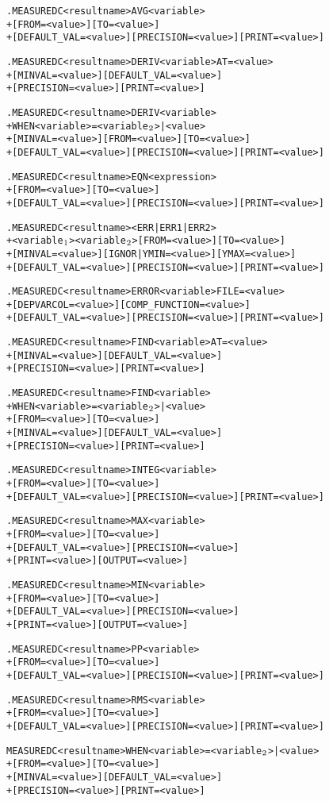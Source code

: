 \begin{Command}
\begin{alltt}
.MEASURE DC <result name> AVG <variable>
+ [FROM=<value>] [TO=<value>]
+ [DEFAULT_VAL=<value>] [PRECISION=<value>] [PRINT=<value>]

.MEASURE DC <result name> DERIV <variable> AT=<value>
+ [MINVAL=<value>] [DEFAULT_VAL=<value>]
+ [PRECISION=<value>] [PRINT=<value>]

.MEASURE DC <result name> DERIV <variable>
+ WHEN <variable>=<variable\(\sb{2}\)>|<value>
+ [MINVAL=<value>] [FROM=<value>] [TO=<value>]
+ [DEFAULT_VAL=<value>] [PRECISION=<value>] [PRINT=<value>]

.MEASURE DC <result name> EQN <expression> 
+ [FROM=<value>] [TO=<value>] 
+ [DEFAULT_VAL=<value>] [PRECISION=<value>] [PRINT=<value>]

.MEASURE DC <result name> <ERR|ERR1|ERR2>
+ <variable\(\sb{1}\)> <variable\(\sb{2}\)> [FROM=<value>] [TO=<value>]
+ [MINVAL=<value>] [IGNOR|YMIN=<value>] [YMAX=<value>]
+ [DEFAULT_VAL=<value>] [PRECISION=<value>] [PRINT=<value>]

.MEASURE DC <result name> ERROR <variable> FILE=<value>
+ [DEPVARCOL=<value>] [COMP_FUNCTION=<value>]
+ [DEFAULT_VAL=<value>] [PRECISION=<value>] [PRINT=<value>]

.MEASURE DC <result name> FIND <variable> AT=<value>
+ [MINVAL=<value>] [DEFAULT_VAL=<value>]
+ [PRECISION=<value>] [PRINT=<value>]

.MEASURE DC <result name> FIND <variable>
+ WHEN <variable>=<variable\(\sb{2}\)>|<value>
+ [FROM=<value>] [TO=<value>]
+ [MINVAL=<value>] [DEFAULT_VAL=<value>]
+ [PRECISION=<value>] [PRINT=<value>]

.MEASURE DC <result name> INTEG <variable>
+ [FROM=<value>] [TO=<value>]
+ [DEFAULT_VAL=<value>] [PRECISION=<value>] [PRINT=<value>]

.MEASURE DC <result name> MAX <variable>
+ [FROM=<value>] [TO=<value>] 
+ [DEFAULT_VAL=<value>] [PRECISION=<value>] 
+ [PRINT=<value>] [OUTPUT=<value>]

.MEASURE DC <result name> MIN <variable>
+ [FROM=<value>] [TO=<value>] 
+ [DEFAULT_VAL=<value>] [PRECISION=<value>]
+ [PRINT=<value>] [OUTPUT=<value>]

.MEASURE DC <result name> PP <variable>
+ [FROM=<value>] [TO=<value>] 
+ [DEFAULT_VAL=<value>] [PRECISION=<value>] [PRINT=<value>]

.MEASURE DC <result name> RMS <variable>
+ [FROM=<value>] [TO=<value>]
+ [DEFAULT_VAL=<value>] [PRECISION=<value>] [PRINT=<value>]

MEASURE DC <result name> WHEN <variable>=<variable\(\sb{2}\)>|<value>
+ [FROM=<value>] [TO=<value>]
+ [MINVAL=<value>] [DEFAULT_VAL=<value>]
+ [PRECISION=<value>] [PRINT=<value>]


\end{alltt}
\end{Command}
